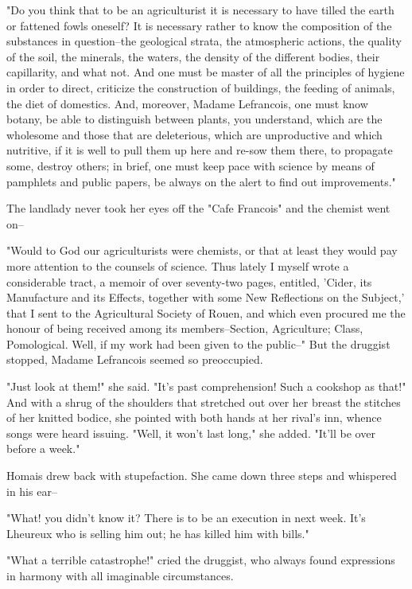 \documentclass{tufte-book}
\begin{document}
"Do you think that to be an agriculturist it is necessary to have tilled
the earth or fattened fowls oneself? It is necessary rather to know the
composition of the substances in question--the geological strata, the
atmospheric actions, the quality of the soil, the minerals, the waters,
the density of the different bodies, their capillarity, and what not.
And one must be master of all the principles of hygiene in order to
direct, criticize the construction of buildings, the feeding of animals,
the diet of domestics. And, moreover, Madame Lefrancois, one must know
botany, be able to distinguish between plants, you understand, which are
the wholesome and those that are deleterious, which are unproductive
and which nutritive, if it is well to pull them up here and re-sow them
there, to propagate some, destroy others; in brief, one must keep pace
with science by means of pamphlets and public papers, be always on the
alert to find out improvements."

The landlady never took her eyes off the "Cafe Francois" and the chemist
went on--

"Would to God our agriculturists were chemists, or that at least they
would pay more attention to the counsels of science. Thus lately I
myself wrote a considerable tract, a memoir of over seventy-two pages,
entitled, 'Cider, its Manufacture and its Effects, together with some
New Reflections on the Subject,' that I sent to the Agricultural Society
of Rouen, and which even procured me the honour of being received among
its members--Section, Agriculture; Class, Pomological. Well, if my
work had been given to the public--" But the druggist stopped, Madame
Lefrancois seemed so preoccupied.

"Just look at them!" she said. "It's past comprehension! Such a cookshop
as that!" And with a shrug of the shoulders that stretched out over her
breast the stitches of her knitted bodice, she pointed with both hands
at her rival's inn, whence songs were heard issuing. "Well, it won't
last long," she added. "It'll be over before a week."

Homais drew back with stupefaction. She came down three steps and
whispered in his ear--

"What! you didn't know it? There is to be an execution in next week.
It's Lheureux who is selling him out; he has killed him with bills."

"What a terrible catastrophe!" cried the druggist, who always found
expressions in harmony with all imaginable circumstances.
\end{document}
